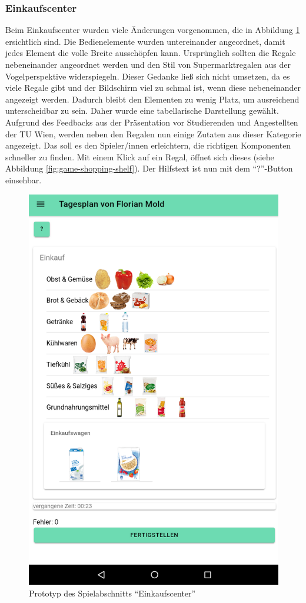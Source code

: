 \subsubsection{Einkaufscenter}
Beim Einkaufscenter wurden viele Änderungen vorgenommen, die in Abbildung \ref{fig:game-shopping-center} ersichtlich sind. Die Bedienelemente wurden untereinander angeordnet, damit jedes Element die volle Breite ausschöpfen kann. Ursprünglich sollten die Regale nebeneinander angeordnet werden und den Stil von Supermarktregalen aus der Vogelperspektive widerspiegeln. Dieser Gedanke ließ sich nicht umsetzen, da es viele Regale gibt und der Bildschirm viel zu schmal ist, wenn diese nebeneinander angezeigt werden. Dadurch bleibt den Elementen zu wenig Platz, um ausreichend unterscheidbar zu sein. Daher wurde eine tabellarische Darstellung gewählt. Aufgrund des Feedbacks aus der Präsentation vor Studierenden und Angestellten der TU Wien, werden neben den Regalen nun einige Zutaten aus dieser Kategorie angezeigt. Das soll es den Spieler/innen erleichtern, die richtigen Komponenten schneller zu finden. Mit einem Klick auf ein Regal, öffnet sich dieses (siehe Abbildung \ref{fig:game-shopping-shelf}). Der Hilfstext ist nun mit dem \enquote{?}-Button einsehbar.

\begin{figure}[H]
    \centering
	\includegraphics[width=0.5\linewidth]{figures/development/application/shopping-center.png}
	\caption{Prototyp des Spielabschnitts \enquote{Einkaufscenter}}
	\label{fig:game-shopping-center}
\end{figure}

